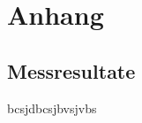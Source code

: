 \section{Anhang}\label{sec:anhang}

\subsection{Messresultate}\label{sec:messresultate}

bcsjdbcsjbvsjvbs